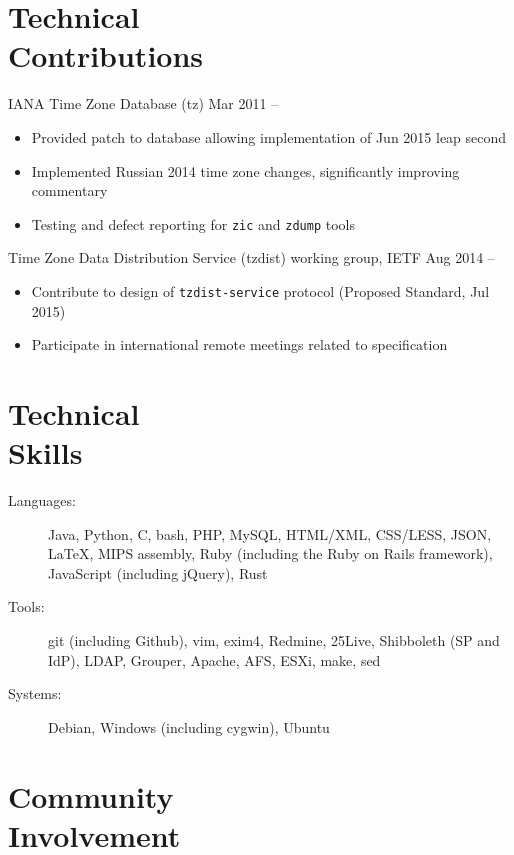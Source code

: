 \documentclass[11pt]{article}
\newcommand{\textdb}[1]{\fontseries{db}\selectfont#1\normalfont}
\newcommand{\present}{\phantom{Xxx 20XX}}
\newcommand{\itemizeonly}{\leavevmode\par\vspace{\dimexpr-\baselineskip-\parskip}}
\begin{document}
\section{Technical\\ Contributions}

\textdb{
IANA Time Zone Database (tz)
	\hfill Mar 2011 -- \present
}
\begin{itemize}
	\item Provided patch to database allowing implementation of Jun 2015 leap second
	\item Implemented Russian 2014 time zone changes,
		significantly improving commentary
	\item Testing and defect reporting for \texttt{zic} and \texttt{zdump} tools
\end{itemize}

\textdb{
Time Zone Data Distribution Service (tzdist) working group, IETF
	\hfill Aug 2014 -- \present
}
\begin{itemize}
	\item Contribute to design of \texttt{tzdist-service} protocol (Proposed Standard, Jul 2015)
	\item Participate in international remote meetings related to specification
\end{itemize}



\section{Technical\\ Skills}

\itemizeonly
\begin{description}
	\item[\textdb{Languages:}] Java, Python, C, bash, PHP, MySQL, HTML/XML, CSS/LESS, JSON,
		\LaTeX, MIPS assembly, Ruby (including the Ruby on Rails framework), JavaScript (including jQuery), Rust
	\item[\textdb{Tools:}] git (including Github), vim, exim4, Redmine, 25Live, Shibboleth (SP and IdP),
		LDAP, Grouper, Apache, AFS, ESXi, make, sed
	\item[\textdb{Systems:}] Debian, Windows (including cygwin), Ubuntu
\end{description}



\section{Community\\ Involvement}
\end{document}
